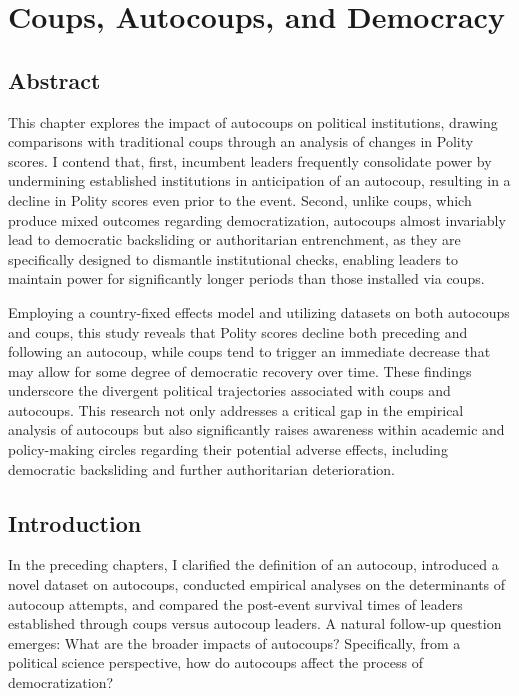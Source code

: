 \documentclass[
  12pt,
]{report}
\begin{document}
\chapter{Coups, Autocoups, and
Democracy}\label{coups-autocoups-and-democracy}

\section*{Abstract}\label{abstract-4}

This chapter explores the impact of autocoups on political institutions,
drawing comparisons with traditional coups through an analysis of
changes in Polity scores. I contend that, first, incumbent leaders
frequently consolidate power by undermining established institutions in
anticipation of an autocoup, resulting in a decline in Polity scores
even prior to the event. Second, unlike coups, which produce mixed
outcomes regarding democratization, autocoups almost invariably lead to
democratic backsliding or authoritarian entrenchment, as they are
specifically designed to dismantle institutional checks, enabling
leaders to maintain power for significantly longer periods than those
installed via coups.

Employing a country-fixed effects model and utilizing datasets on both
autocoups and coups, this study reveals that Polity scores decline both
preceding and following an autocoup, while coups tend to trigger an
immediate decrease that may allow for some degree of democratic recovery
over time. These findings underscore the divergent political
trajectories associated with coups and autocoups. This research not only
addresses a critical gap in the empirical analysis of autocoups but also
significantly raises awareness within academic and policy-making circles
regarding their potential adverse effects, including democratic
backsliding and further authoritarian deterioration.

\section{Introduction}\label{introduction-4}

In the preceding chapters, I clarified the definition of an autocoup,
introduced a novel dataset on autocoups, conducted empirical analyses on
the determinants of autocoup attempts, and compared the post-event
survival times of leaders established through coups versus autocoup
leaders. A natural follow-up question emerges: What are the broader
impacts of autocoups? Specifically, from a political science
perspective, how do autocoups affect the process of democratization?
\end{document}
